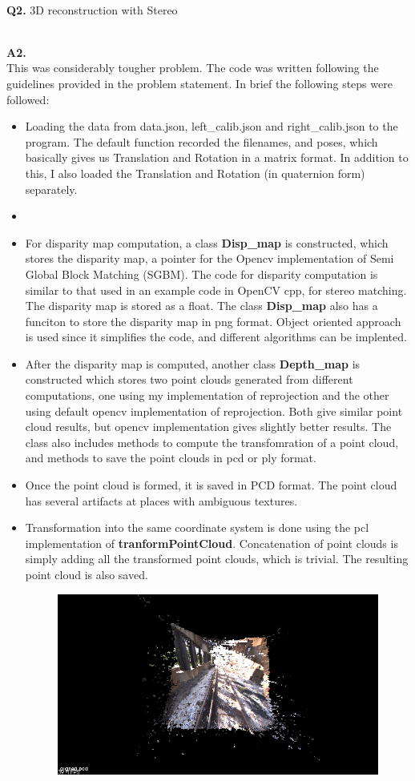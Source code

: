 \documentclass{article}
\newcommand\Problem[1]{
  \\
  \textbf{Q#1.}
}
\newcommand\Sol[1]{
  \\
  \textbf{A#1.}
  \\
}
\begin{document}
\Problem{2} 3D reconstruction with Stereo
\Sol{2} This was considerably tougher problem. The code was written following the guidelines provided in the problem statement. In brief the following steps were followed:
\begin{itemize}
\item Loading the data from data.json, left\_calib.json and right\_calib.json to the program. The default function recorded the filenames, and poses, which basically gives us Translation and Rotation in a matrix format. In addition to this, I also loaded the Translation and Rotation (in quaternion form) separately. 
\item 
\item For disparity map computation, a class \textbf{Disp\_map} is constructed, which stores the disparity map, a pointer for the Opencv implementation of Semi Global Block Matching (SGBM). The code for disparity computation is similar to that used in an example code in OpenCV cpp, for stereo matching. The disparity map is stored as a float. The class \textbf{Disp\_map} also has a funciton to store the disparity map in png format. Object oriented approach is used since it simplifies the code, and different algorithms can be implented.
\item After the disparity map is computed, another class \textbf{Depth\_map} is constructed which stores two point clouds generated from different computations, one using my implementation of reprojection and the other using default opencv implementation of reprojection. Both give similar point cloud results, but opencv implementation gives slightly better results. The class also includes methods to compute the transfomration of a point cloud, and methods to save the point clouds in pcd or ply format.
\item Once the point cloud is formed, it is saved in PCD format. The point cloud has several artifacts at places with ambiguous textures.
\item Transformation into the same coordinate system is done using the pcl implementation of \textbf{tranformPointCloud}. Concatenation of point clouds is simply adding all the transformed point clouds, which is trivial. The resulting point cloud is also saved.
  \begin{figure}[H]
    \centering
    \includegraphics[scale=0.5]{images/aligned_initial}

\end{figure}
\end{itemize}
\end{document}
